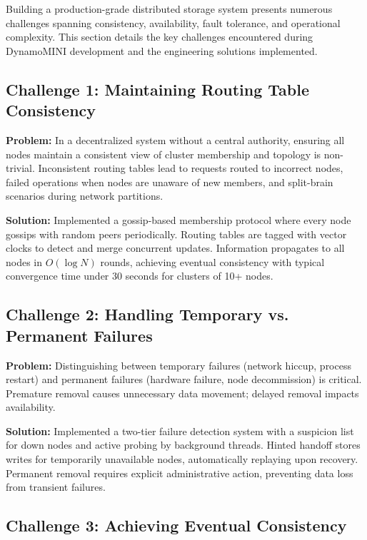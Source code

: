 \documentclass[conference]{IEEEtran}
\begin{document}
Building a production-grade distributed storage system presents numerous challenges spanning consistency, availability, fault tolerance, and operational complexity. This section details the key challenges encountered during DynamoMINI development and the engineering solutions implemented.

\subsection{Challenge 1: Maintaining Routing Table Consistency}

\textbf{Problem:} In a decentralized system without a central authority, ensuring all nodes maintain a consistent view of cluster membership and topology is non-trivial. Inconsistent routing tables lead to requests routed to incorrect nodes, failed operations when nodes are unaware of new members, and split-brain scenarios during network partitions.

\textbf{Solution:} Implemented a gossip-based membership protocol where every node gossips with random peers periodically. Routing tables are tagged with vector clocks to detect and merge concurrent updates. Information propagates to all nodes in $O(\log N)$ rounds, achieving eventual consistency with typical convergence time under 30 seconds for clusters of 10+ nodes.

\subsection{Challenge 2: Handling Temporary vs. Permanent Failures}

\textbf{Problem:} Distinguishing between temporary failures (network hiccup, process restart) and permanent failures (hardware failure, node decommission) is critical. Premature removal causes unnecessary data movement; delayed removal impacts availability.

\textbf{Solution:} Implemented a two-tier failure detection system with a suspicion list for down nodes and active probing by background threads. Hinted handoff stores writes for temporarily unavailable nodes, automatically replaying upon recovery. Permanent removal requires explicit administrative action, preventing data loss from transient failures.

\subsection{Challenge 3: Achieving Eventual Consistency}
\end{document}
